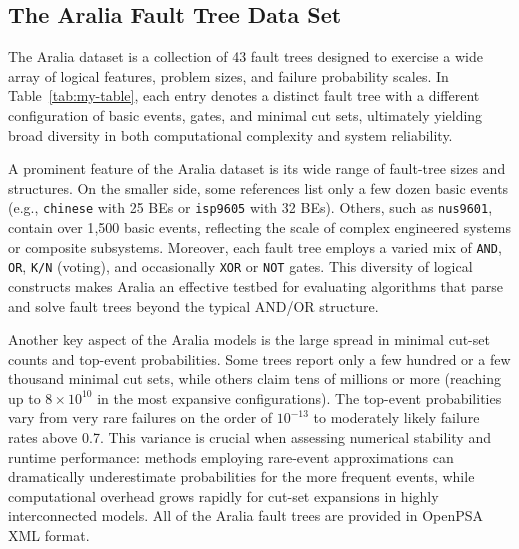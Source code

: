 \subsection{The Aralia Fault Tree Data Set}
\label{subsec:aralia_dataset}

The Aralia dataset is a collection of 43 fault trees designed to exercise a wide array of logical features, problem sizes, and failure probability scales. In Table~\ref{tab:my-table}, each entry denotes a distinct fault tree with a different configuration of basic events, gates, and minimal cut sets, ultimately yielding broad diversity in both computational complexity and system reliability. 

A prominent feature of the Aralia dataset is its wide range of fault-tree sizes and structures. On the smaller side, some references list only a few dozen basic events (e.g., \texttt{chinese} with 25 BEs or \texttt{isp9605} with 32 BEs). Others, such as \texttt{nus9601}, contain over 1{,}500 basic events, reflecting the scale of complex engineered systems or composite subsystems. Moreover, each fault tree employs a varied mix of \texttt{AND}, \texttt{OR}, \texttt{K/N} (voting), and occasionally \texttt{XOR} or \texttt{NOT} gates. This diversity of logical constructs makes Aralia an effective testbed for evaluating algorithms that parse and solve fault trees beyond the typical AND/OR structure.

Another key aspect of the Aralia models is the large spread in minimal cut-set counts and top-event probabilities. Some trees report only a few hundred or a few thousand minimal cut sets, while others claim tens of millions or more (reaching up to \(8\times 10^{10}\) in the most expansive configurations). The top-event probabilities vary from very rare failures on the order of \(10^{-13}\) to moderately likely failure rates above 0.7. This variance is crucial when assessing numerical stability and runtime performance: methods employing rare-event approximations can dramatically underestimate probabilities for the more frequent events, while computational overhead grows rapidly for cut-set expansions in highly interconnected models. All of the Aralia fault trees are provided in OpenPSA XML format.

